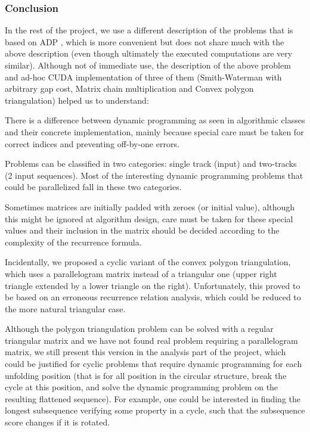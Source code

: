 \subsubsection{Conclusion}
In the rest of the project, we use a different description of the problems that is based on ADP \cite{adp}, which is more convenient but does not share much with the above description (even though ultimately the executed computations are very similar). Although not of immediate use, the description of the above problem and ad-hoc CUDA implementation of three of them (Smith-Waterman with arbitrary gap cost, Matrix chain multiplication and Convex polygon triangulation) helped us to understand:\ol
\item There is a difference between dynamic programming as seen in algorithmic classes and their concrete implementation, mainly because special care must be taken for correct indices and preventing off-by-one errors.
\item Problems can be classified in two categories: single track (input) and two-tracks (2 input sequences). Most of the interesting dynamic programming problems that could be parallelized fall in these two categories.
\item Sometimes matrices are initially padded with zeroes (or initial value), although this might be ignored at algorithm design, care must be taken for these special values and their inclusion in the matrix should be decided according to the complexity of the recurrence formula.
\item Incidentally, we proposed a cyclic variant of the convex polygon triangulation, which uses a parallelogram matrix instead of a triangular one (upper right triangle extended by a lower triangle on the right). Unfortunately, this proved to be based on an erroneous recurrence relation analysis, which could be reduced to the more natural triangular case.

Although the polygon triangulation problem can be solved with a regular triangular matrix and we have not found real problem requiring a parallelogram matrix, we still present this version in the analysis part of the project, which could be justified for cyclic problems that require dynamic programming for each unfolding position (that is for all position in the circular structure, break the cycle at this position, and solve the dynamic programming problem on the resulting flattened sequence). For example, one could be interested in finding the longest subsequence verifying some property in a cycle, such that the subsequence score changes if it is rotated.
\ole

